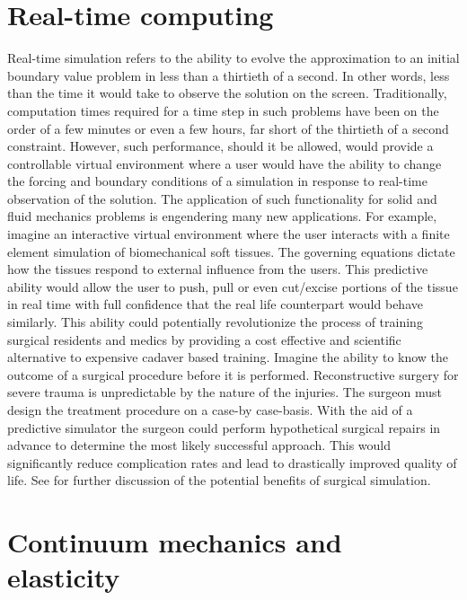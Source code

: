\documentclass[article]{pcms-l}
\begin{document}
\section*{Real-time computing}
Real-time simulation refers to the ability to evolve the approximation to an initial boundary value problem in less than a thirtieth of a second. In other words, less than the time it would take to observe the solution on the screen. Traditionally, computation times required for a time step in such problems have been on the order of a few minutes or even a few hours, far short of the thirtieth of a second constraint. However, such performance, should it be allowed, would provide a controllable virtual environment where a user would have the ability to change the forcing and boundary conditions of a simulation in response to real-time observation of the solution. The application of such functionality for solid and fluid mechanics problems is engendering many new applications. For example, imagine an interactive virtual environment where the user interacts with a finite element simulation of biomechanical soft tissues. The governing equations dictate how the tissues respond to external influence from the users. This predictive ability would allow the user to push, pull or even cut/excise portions of the tissue in real time with full confidence that the real life counterpart would behave similarly. This ability could potentially revolutionize the process of training surgical residents and medics by providing a cost effective and scientific alternative to expensive cadaver based training. Imagine the ability to know the outcome of a surgical procedure before it is performed. Reconstructive surgery for severe trauma is unpredictable by the nature of the injuries. The surgeon must design the treatment procedure on a case-by case-basis. With the aid of a predictive simulator the surgeon could perform hypothetical surgical repairs in advance to determine the most likely successful approach. This would significantly reduce complication rates and lead to drastically improved quality of life. See \cite{SHTOC09} for further discussion of the potential benefits of surgical simulation.

\section*{Continuum mechanics and elasticity}
\end{document}
